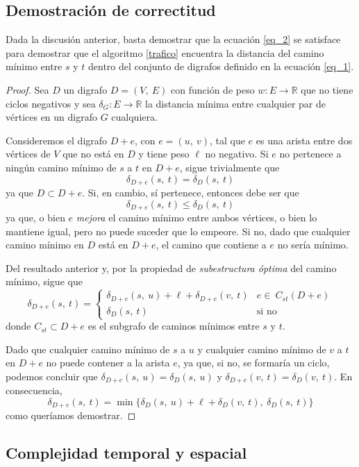 \subsection{Demostración de correctitud}\label{correctitud}  

Dada la discusión anterior, basta demostrar que la ecuación \ref{eq_2} se satisface para demostrar que el algoritmo \ref{trafico} encuentra la distancia del camino mínimo entre $s$ y $t$ dentro del conjunto de digrafos definido en la ecuación \ref{eq_1}.

\begin{proof} 
    Sea $D$ un digrafo $D = (V,\ E)$ con función de peso $w: E \to \mathbb{R}$ que no tiene ciclos negativos y sea  $\delta_G : E \to \mathbb{R}$ la distancia mínima entre cualquier par de vértices en un digrafo $G$ cualquiera.

    Consideremos el digrafo $D+e$, con $e = (u,\ v)$, tal que $e$ es una arista entre dos vértices de $V$ que no está en $D$ y tiene peso $\ell$ no negativo. Si $e$ no pertenece a ningún camino mínimo de $s$ a $t$ en $D + e$, sigue trivialmente que  
    \begin{equation*}
        \delta_{D + e}(s,\ t) = \delta_{D}(s,\ t)
    \end{equation*}
    ya que $D \subset D + e$. Si, en cambio, sí pertenece, entonces debe ser que
    \begin{equation*}
        \delta_{D + e}(s,\ t) \leq \delta_{D}(s,\ t)
    \end{equation*} 
    ya que, o bien $e$ \textit{mejora} el camino mínimo entre ambos vértices, o bien lo mantiene igual, pero no puede suceder que lo empeore. Si no, dado que cualquier camino mínimo en $D$ está en $D + e$, el camino que contiene a $e$ no sería mínimo. 
    
    Del resultado anterior y, por la propiedad de \textit{subestructura óptima} del camino mínimo, sigue que
    \begin{equation*}
        \delta_{D + e}(s,\ t) = \begin{cases}
            \delta_{D + e}(s,\ u) + \ell + \delta_{D + e}(v,\ t) &e \in\ C_{st}(D+e)\\
            \delta_{D}(s,\ t) &\text{si no}
        \end{cases}
    \end{equation*}
    donde $C_{st} \subset D + e$ es el subgrafo de caminos mínimos entre $s$ y $t$.

    Dado que cualquier camino mínimo de $s$ a $u$ y cualquier camino mínimo de $v$ a $t$ en $D + e$ no puede contener a la arista $e$, ya que, si no, se formaría un ciclo, podemos concluir que $ \delta_{D + e}(s,\ u) = \delta_{D}(s,\ u) $ y $ \delta_{D + e}(v,\ t) = \delta_{D}(v,\ t)$. 
    En consecuencia, 
    \begin{equation*}
        \delta_{D + e}(s,\ t) = \min\{\delta_{D}(s,\ u) + \ell + \delta_{D}(v,\ t),\ \delta_{D}(s,\ t)\}
    \end{equation*}
    como queríamos demostrar.
\end{proof}
    
\subsection{Complejidad temporal y espacial} 
